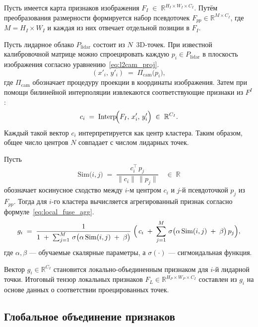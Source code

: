 Пусть имеется карта признаков изображения $F_{I} \;\in\; \mathbb{R}^{H_{I} \times W_{I} \times C_I}$.
Путём преобразования размерности формируется набор псевдоточек $F_{pp} \in \mathbb{R}^{M\times C_I}$, где $M=H_I\times W_I$
и каждая из них отвечает отдельной позиции в $F_{I}$.

Пусть лидарное облако ${P}_{\mathrm{lidar}}$ состоит из $N$~3D-точек. При известной калибровочной матрице 
можно спроецировать каждую ${p}_i \in {P}_{\mathrm{lidar}}$ в плоскость изображения согласно уравнению~\eqref{eq:l2cam_proj}. 
\begin{equation}
  \label{eq:l2cam_proj}
  (x'_i,\, y'_i) \;=\; \Pi_{\mathrm{cam}}\!\bigl({p}_i\bigr),
\end{equation}
где $\Pi_{\mathrm{cam}}$ обозначает процедуру проекции в координаты изображения.
Затем при помощи билинейной интерполяции извлекаются соответствующие признаки из ${F}^{I}$:
\begin{equation*}
  {c}_i \;=\; \mathrm{Interp}\!\Bigl({F}_{I},\, x'_i,\, y'_i\Bigr)
  \;\in\;\mathbb{R}^{C_I}.
\end{equation*}
Каждый такой вектор ${c}_i$ интерпретируется как центр кластера. 
Таким образом, общее число центров $N$ совпадает с числом лидарных точек.

Пусть \[
\mathrm{Sim}\!\bigl(i,j\bigr) 
  \;=\;
  \frac{{c}_i^\top\,{p}_j}
       {\|{c}_i\|\,\|{p}_j\|} 
  \quad\in\;\mathbb{R}
\]
обозначает косинусное сходство между $i$-м центром ${c}_i$ и $j$-й псевдоточкой ${p}_j$ из $F_{pp}$. 
Тогда для $i$-го кластера вычисляется агрегированный признак согласно формуле~\eqref{eq:local_fuse_agg}.
\begin{equation}
\label{eq:local_fuse_agg}
  {g}_i
  \;=\;
  \frac{1}{1 \;+\; \sum_{j=1}^M\,\sigma\bigl(\alpha\, \mathrm{Sim}(i,j) \;+\;\beta\bigr)}\;
  \Bigl(\,
    {c}_i 
    \;+\;
    \sum_{j=1}^M\,\sigma\bigl(\alpha\, \mathrm{Sim}(i,j) \;+\;\beta\bigr)\,{p}_j
  \Bigr),
\end{equation}
где $\alpha,\beta$ --- обучаемые скалярные параметры, а $\sigma(\cdot)$ --- сигмоидальная функция. 

Вектор ${g}_i \in \mathbb{R}^{C_I}$ становится {локально-объединенным} признаком для $i$-й лидарной точки. 
Итоговый тензор локальных признаков $F_L \in \mathbb{R}^{H_P\times W_P \times C_I}$ составлен из $g_i$ на 
основе данных о соответствии проецированных точек.

\subsection{Глобальное объединение признаков}
\label{sec:global_fuser}

